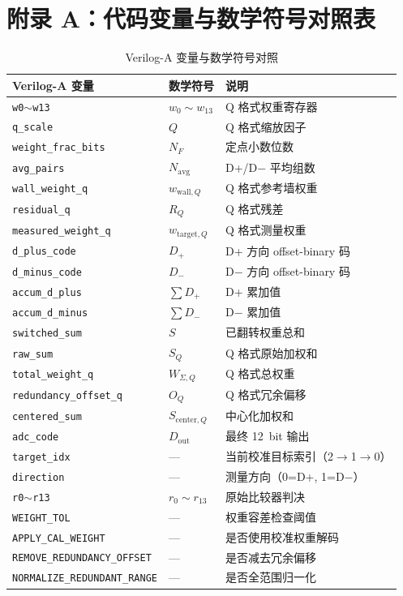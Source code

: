 \documentclass[
  UTF8,
  a4paper,
  11pt,
  oneside,
  fontset=fandol
]{ctexrep}
\newcommand{\code}[1]{\texttt{#1}}
\newcommand{\Dout}{D_{\mathrm{out}}}
\begin{document}
\chapter*{附录 A：代码变量与数学符号对照表}

\begin{table}[H]
\centering
\caption{Verilog-A 变量与数学符号对照}
\label{tab:varmap}
\small
\begin{tabularx}{\textwidth}{l l X}
\toprule
Verilog-A 变量 & 数学符号 & 说明 \\
\midrule
\code{w0}$\sim$\code{w13} & $w_0 \sim w_{13}$ & Q 格式权重寄存器 \\
\code{q\_scale} & $Q$ & Q 格式缩放因子 \\
\code{weight\_frac\_bits} & $N_F$ & 定点小数位数 \\
\code{avg\_pairs} & $N_{\mathrm{avg}}$ & D+/D$-$ 平均组数 \\
\code{wall\_weight\_q} & $w_{\mathrm{wall},Q}$ & Q 格式参考墙权重 \\
\code{residual\_q} & $R_Q$ & Q 格式残差 \\
\code{measured\_weight\_q} & $w_{\mathrm{target},Q}$ & Q 格式测量权重 \\
\code{d\_plus\_code} & $D_+$ & D+ 方向 offset-binary 码 \\
\code{d\_minus\_code} & $D_-$ & D$-$ 方向 offset-binary 码 \\
\code{accum\_d\_plus} & $\sum D_+$ & D+ 累加值 \\
\code{accum\_d\_minus} & $\sum D_-$ & D$-$ 累加值 \\
\code{switched\_sum} & $S$ & 已翻转权重总和 \\
\code{raw\_sum} & $S_Q$ & Q 格式原始加权和 \\
\code{total\_weight\_q} & $W_{\Sigma,Q}$ & Q 格式总权重 \\
\code{redundancy\_offset\_q} & $O_Q$ & Q 格式冗余偏移 \\
\code{centered\_sum} & $S_{\mathrm{center},Q}$ & 中心化加权和 \\
\code{adc\_code} & $\Dout$ & 最终 \SI{12}{bit} 输出 \\
\code{target\_idx} & --- & 当前校准目标索引（2$\to$1$\to$0） \\
\code{direction} & --- & 测量方向（0=D+, 1=D$-$） \\
\code{r0}$\sim$\code{r13} & $r_0 \sim r_{13}$ & 原始比较器判决 \\
\code{WEIGHT\_TOL} & --- & 权重容差检查阈值 \\
\code{APPLY\_CAL\_WEIGHT} & --- & 是否使用校准权重解码 \\
\code{REMOVE\_REDUNDANCY\_OFFSET} & --- & 是否减去冗余偏移 \\
\code{NORMALIZE\_REDUNDANT\_RANGE} & --- & 是否全范围归一化 \\
\bottomrule
\end{tabularx}
\end{table}
\end{document}
